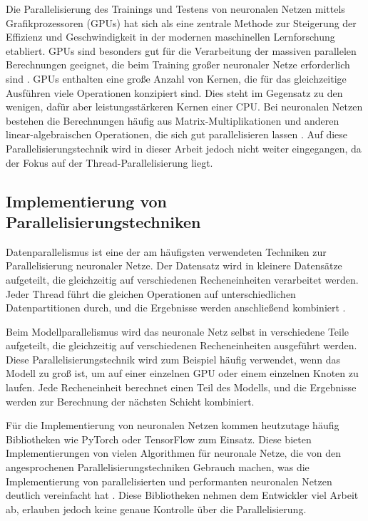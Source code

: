 Die Parallelisierung des Trainings und Testens von neuronalen Netzen mittels Grafikprozessoren (GPUs) hat sich als eine zentrale Methode zur Steigerung der Effizienz und Geschwindigkeit in der modernen maschinellen Lernforschung etabliert. GPUs sind besonders gut für die Verarbeitung der massiven parallelen Berechnungen geeignet, die beim Training großer neuronaler Netze erforderlich sind \citep{scalable_parallel_programming_with_cuda}. GPUs enthalten eine große Anzahl von Kernen, die für das gleichzeitige Ausführen viele Operationen konzipiert sind. Dies steht im Gegensatz zu den wenigen, dafür aber leistungsstärkeren Kernen einer CPU. Bei neuronalen Netzen bestehen die Berechnungen häufig aus Matrix-Multiplikationen und anderen linear-algebraischen Operationen, die sich gut parallelisieren lassen \citep{scalable_parallel_programming_with_cuda}. Auf diese Parallelisierungstechnik wird in dieser Arbeit jedoch nicht weiter eingegangen, da der Fokus auf der Thread-Parallelisierung liegt.

\subsection{Implementierung von Parallelisierungstechniken}
\label{sec:Grundlagen_Parallelisierung_Implementierung}
Datenparallelismus ist eine der am häufigsten verwendeten Techniken zur Parallelisierung neuronaler Netze. Der Datensatz wird in kleinere Datensätze aufgeteilt, die gleichzeitig auf verschiedenen Recheneinheiten verarbeitet werden. Jeder Thread führt die gleichen Operationen auf unterschiedlichen Datenpartitionen durch, und die Ergebnisse werden anschließend kombiniert \citep{pytorch_advances_in_neural_systems}.

Beim Modellparallelismus wird das neuronale Netz selbst in verschiedene Teile aufgeteilt, die gleichzeitig auf verschiedenen Recheneinheiten ausgeführt werden. Diese Parallelisierungstechnik wird zum Beispiel häufig verwendet, wenn das Modell zu groß ist, um auf einer einzelnen GPU oder einem einzelnen Knoten zu laufen. Jede Recheneinheit berechnet einen Teil des Modells, und die Ergebnisse werden zur Berechnung der nächsten Schicht kombiniert.

Für die Implementierung von neuronalen Netzen kommen heutzutage häufig Bibliotheken wie PyTorch oder TensorFlow zum Einsatz. Diese bieten Implementierungen von vielen Algorithmen für neuronale Netze, die von den angesprochenen Parallelisierungstechniken Gebrauch machen, was die Implementierung von parallelisierten und performanten neuronalen Netzen deutlich vereinfacht hat \citep{pytorch_advances_in_neural_systems}.
Diese Bibliotheken nehmen dem Entwickler viel Arbeit ab, erlauben jedoch keine genaue Kontrolle über die Parallelisierung.

